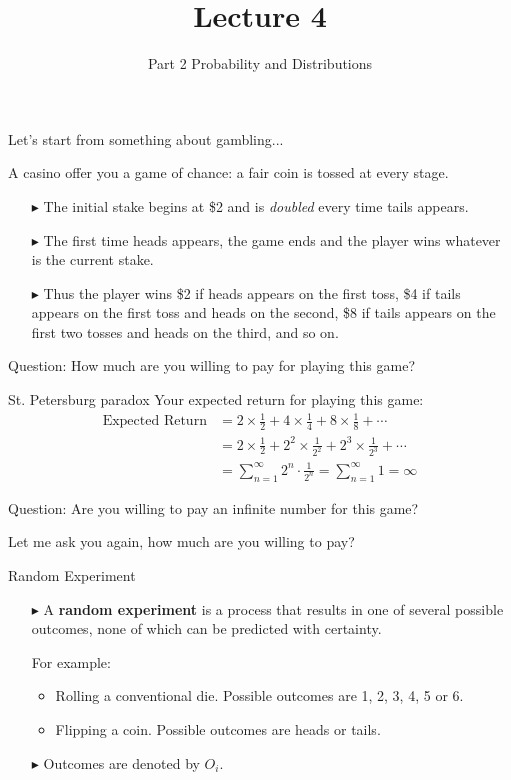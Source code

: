 \documentclass[12pt]{beamer}
\title[ECON2843]{Lecture 4}
\subtitle{Part 2 Probability and Distributions}
\date{}
\begin{document}
	\begin{frame}
		\titlepage
	\end{frame}
\begin{frame}
Let's start from something about gambling...
\end{frame}
\begin{frame}
	A casino offer you a game of chance: a fair coin is tossed at every stage.
	\begin{itemize}
		\item[$\blacktriangleright$] The initial stake begins at \$2 and is {\sl doubled} every time tails appears.
		\item[$\blacktriangleright$] The first time heads appears, the game ends and the player wins whatever is the current stake.
		\item[$\blacktriangleright$] Thus the player wins \$2 if heads appears on the first toss, \$4 if tails appears on the first toss and heads on the second, \$8 if tails appears on the first two tosses and heads on the third, and so on.
	\end{itemize}
	Question: How much are you willing to pay for playing this game?
\end{frame}
\begin{frame}{St. Petersburg paradox}
Your expected return for playing this game:
\begin{align*}
	\text{Expected Return}&=2\times\frac{1}{2}+4\times\frac{1}{4}+8\times\frac{1}{8}+\cdots\\
	&=2\times\frac{1}{2}+2^2\times\frac{1}{2^2}+2^3\times\frac{1}{2^3}+\cdots\\
	&= \sum_{n=1}^{\infty} 2^n \cdot \frac{1}{2^n}= \sum_{n=1}^{\infty} 1= \infty
\end{align*}

Question: Are you willing to pay an infinite number for this game?

Let me ask you again, how much are you willing to pay?
\end{frame}
\begin{frame}{Random Experiment}
	\begin{itemize}
		\item[$\blacktriangleright$] A {\bf random experiment} is a process that results in one of several possible outcomes, none of which can be predicted with certainty.
		
		For example:
		\begin{itemize}
			\item Rolling a conventional die. Possible outcomes are 1, 2, 3, 4, 5 or 6.
			\item Flipping a coin. Possible outcomes are heads or tails.
     	\end{itemize}
		\item[$\blacktriangleright$] Outcomes are denoted by $O_i$.
	\end{itemize}
\end{frame}
\end{document}
